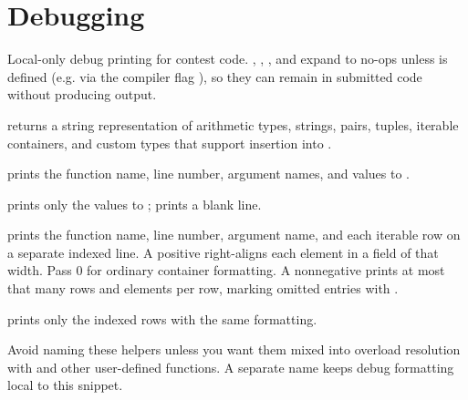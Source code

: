 \section{\texorpdfstring{Debugging}{8.3 Debugging}}
\setcounter{section}{3}
\label{sec:8.3}
Local-only debug printing for contest code. , , , and  expand to no-ops unless  is defined (e.g. via the compiler flag ), so they can remain in submitted code without producing output.

\begin{compactitem}
  \item {} returns a string representation of arithmetic types, strings, pairs, tuples, iterable containers, and custom types that support insertion into .
  \item {} prints the function name, line number, argument names, and values to .
  \item {} prints only the values to ;  prints a blank line.
  \item {} prints the function name, line number, argument name, and each iterable row on a separate indexed line. A positive  right-aligns each element in a field of that width. Pass $0$ for ordinary container formatting. A nonnegative  prints at most that many rows and elements per row, marking omitted entries with .
  \item {} prints only the indexed rows with the same formatting.
\end{compactitem}

Avoid naming these helpers  unless you want them mixed into overload resolution with  and other user-defined  functions. A separate name keeps debug formatting local to this snippet.

